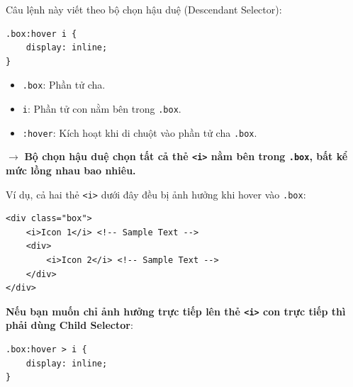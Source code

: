 \documentclass[11pt,oneside]{book}
\newcommand{\codeinline}[1]{\textcolor{accentOrange}{\texttt{#1}}}
\begin{document}
\begin{conceptBox}
Câu lệnh này viết theo bộ chọn hậu duệ (Descendant Selector):
\begin{codeWindow}
\begin{lstlisting}[language=CSS3]
.box:hover i {
    display: inline;
}
\end{lstlisting}
\end{codeWindow}
\begin{itemize}[leftmargin=1.5em, itemsep=2pt, parsep=0pt]
    \item \codeinline{.box}: Phần tử cha.
    \item \codeinline{i}: Phần tử con nằm bên trong \codeinline{.box}.
    \item \codeinline{:hover}: Kích hoạt khi di chuột vào phần tử cha \codeinline{.box}.
\end{itemize}
$\rightarrow$ \textbf{Bộ chọn hậu duệ chọn tất cả thẻ \codeinline{<i>} nằm bên trong \codeinline{.box}, bất kể mức lồng nhau bao nhiêu.}

Ví dụ, cả hai thẻ \codeinline{<i>} dưới đây đều bị ảnh hưởng khi hover vào \codeinline{.box}:
\begin{codeWindow}
\begin{lstlisting}[language=HTML5]
<div class="box">
    <i>Icon 1</i> <!-- Sample Text -->
    <div>
        <i>Icon 2</i> <!-- Sample Text -->
    </div>
</div>
\end{lstlisting}
\end{codeWindow}

\textbf{Nếu bạn muốn chỉ ảnh hưởng trực tiếp lên thẻ \codeinline{<i>} con trực tiếp thì phải dùng Child Selector}:
\begin{codeWindow}
\begin{lstlisting}[language=CSS3]
.box:hover > i {
    display: inline;
}
\end{lstlisting}
\end{codeWindow}
\end{conceptBox}
\end{document}
